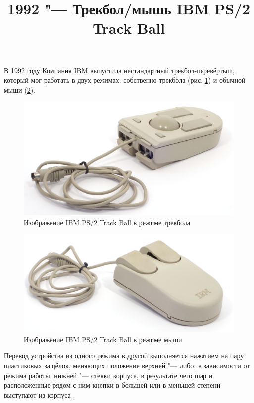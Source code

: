 \documentclass[11pt, a4paper]{article}
\begin{document}
\title{1992 "--- Трекбол/мышь IBM PS/2 Track Ball}
\date{}
\maketitle
В 1992 году Компания IBM выпустила нестандартный трекбол-перевёртыш, который мог работать в двух режимах: собственно трекбола (рис. \ref{fig:IBMConvertibleTrackball}) и обычной мыши (\ref{fig:IBMConvertibleMouse}).

\begin{figure}[h]
    \centering
    \includegraphics[scale=0.5]{1992_ibm_convertible/picball_60}
    \caption{Изображение IBM PS/2 Track Ball в режиме трекбола}
    \label{fig:IBMConvertibleTrackball}
\end{figure}

\begin{figure}[h]
    \centering
    \includegraphics[scale=0.5]{1992_ibm_convertible/picmouse_60}
    \caption{Изображение IBM PS/2 Track Ball в режиме мыши}
    \label{fig:IBMConvertibleMouse}
\end{figure}

Перевод устройства из одного режима в другой выполняется нажатием на пару пластиковых защёлок, меняющих положение верхней "--- либо, в зависимости от режима работы, нижней "--- стенки корпуса, в результате чего шар и расположенные рядом с ним кнопки в большей или в меньшей степени выступают из корпуса \cite{mouses}.
\end{document}
